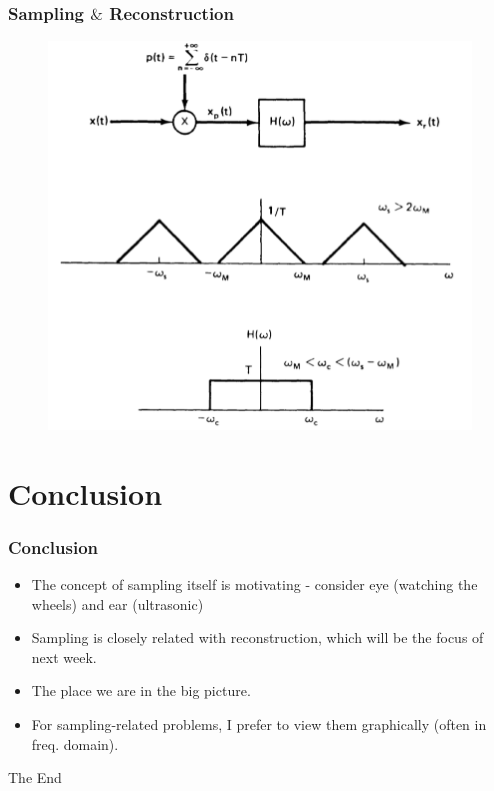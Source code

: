 \documentclass{beamer}
\begin{document}
\begin{frame}
\frametitle{Sampling $\&$ Reconstruction}
\begin{figure}
\includegraphics[width=0.6\linewidth]{sample4}
\end{figure}
\end{frame}


\section{Conclusion}
\begin{frame}
\frametitle{Conclusion}
\begin{itemize}
\item The concept of sampling itself is motivating - consider eye (watching the wheels) and ear (ultrasonic)
\item Sampling is closely related with reconstruction, which will be the focus of next week.
\item The place we are in the big picture.
\item For sampling-related problems, I prefer to view them graphically (often in freq. domain).
\end{itemize}
\end{frame}


\begin{frame}
\Huge{\centerline{The End}}
\end{frame}

\end{document}
